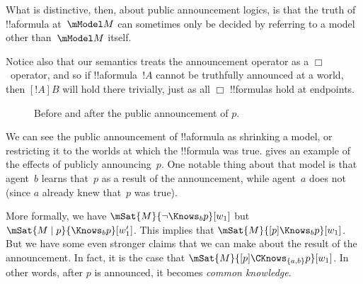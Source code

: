 \documentclass[../../../include/open-logic-section]{subfiles}
\begin{document}
What is distinctive, then, about public announcement logics, is that
the truth of !!a{formula} at~$\mModel M$ can sometimes only be decided
by referring to a model other than~$\mModel M$ itself.

Notice also that our semantics treats the announcement operator as a
$\Box$~operator, and so if !!a{formula}~$!A$ cannot be truthfully
announced at a world, then $[!A]B$ will hold there trivially, just as
all $\Box$ !!{formula}s hold at endpoints. 

\begin{figure}
  \begin{center}
  \end{center}
  \caption{Before and after the public announcement of $p$.}
\end{figure}

We can see the public announcement of !!a{formula} as shrinking a
model, or restricting it to the worlds at which the !!{formula} was
true.  gives an example of the effects
of publicly announcing~$p$. One notable thing about that model is that
agent~$b$ learns that~$p$ as a result of the announcement, while
agent~$a$ does not (since $a$ already knew that~$p$ was true).

More formally, we have $\mSat{M}{\lnot \Knows_b p}[w_1]$ but $\mSat{M
\mid p}{\Knows_b p}[w'_1]$. This implies that $\mSat{M}{[p] \Knows_b
p}[w_1]$. But we have some even stronger claims that we can make about
the result of the announcement. In fact, it is the case that
$\mSat{M}{[p]\CKnows_{\{a,b\}} p}[w_1]$. In other words, after $p$ is
announced, it becomes \emph{common knowledge}.
\end{document}
